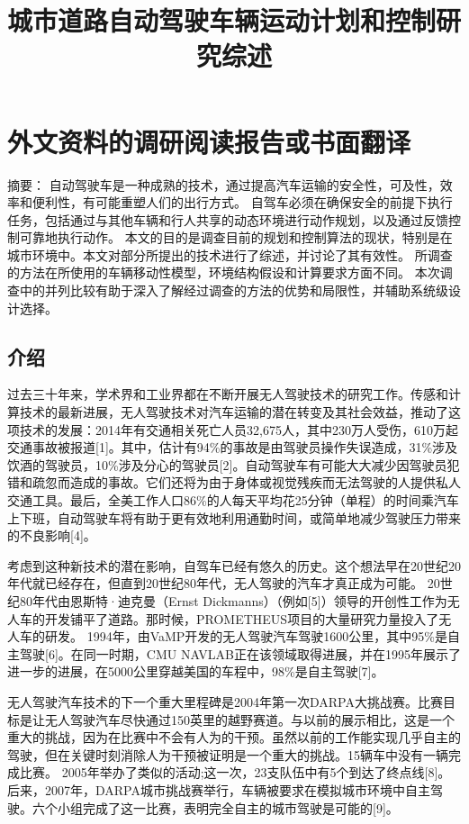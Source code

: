 \chapter{外文资料的调研阅读报告或书面翻译}

\title{城市道路自动驾驶车辆运动计划和控制研究综述}

{\heiti 摘要：} 自动驾驶车是一种成熟的技术，通过提高汽车运输的安全性，可及性，效率和便利性，有可能重塑人们的出行方式。 自驾车必须在确保安全的前提下执行任务，包括通过与其他车辆和行人共享的动态环境进行动作规划，以及通过反馈控制可靠地执行动作。 本文的目的是调查目前的规划和控制算法的现状，特别是在城市环境中。本文对部分所提出的技术进行了综述，并讨论了其有效性。 所调查的方法在所使用的车辆移动性模型，环境结构假设和计算要求方面不同。 本次调查中的并列比较有助于深入了解经过调查的方法的优势和局限性，并辅助系统级设计选择。

\section{介绍}

过去三十年来，学术界和工业界都在不断开展无人驾驶技术的研究工作。传感和计算技术的最新进展，无人驾驶技术对汽车运输的潜在转变及其社会效益，推动了这项技术的发展：2014年有交通相关死亡人员32,675人，其中230万人受伤，610万起交通事故被报道[1]。其中，估计有94\%的事故是由驾驶员操作失误造成，31\%涉及饮酒的驾驶员，10\%涉及分心的驾驶员[2]。自动驾驶车有可能大大减少因驾驶员犯错和疏忽而造成的事故。它们还将为由于身体或视觉残疾而无法驾驶的人提供私人交通工具。最后，全美工作人口86\%的人每天平均花25分钟（单程）的时间乘汽车上下班，自动驾驶车将有助于更有效地利用通勤时间，或简单地减少驾驶压力带来的不良影响[4]。

考虑到这种新技术的潜在影响，自驾车已经有悠久的历史。这个想法早在20世纪20年代就已经存在，但直到20世纪80年代，无人驾驶的汽车才真正成为可能。 20世纪80年代由恩斯特·迪克曼（Ernst Dickmanns）（例如[5]）领导的开创性工作为无人车的开发铺平了道路。那时候，PROMETHEUS项目的大量研究力量投入了无人车的研发。 1994年，由VaMP开发的无人驾驶汽车驾驶1600公里，其中95\%是自主驾驶[6]。在同一时期，CMU NAVLAB正在该领域取得进展，并在1995年展示了进一步的进展，在5000公里穿越美国的车程中，98\%是自主驾驶[7]。

无人驾驶汽车技术的下一个重大里程碑是2004年第一次DARPA大挑战赛。比赛目标是让无人驾驶汽车尽快通过150英里的越野赛道。与以前的展示相比，这是一个重大的挑战，因为在比赛中不会有人为的干预。虽然以前的工作能实现几乎自主的驾驶，但在关键时刻消除人为干预被证明是一个重大的挑战。15辆车中没有一辆完成比赛。 2005年举办了类似的活动;这一次，23支队伍中有5个到达了终点线[8]。后来，2007年，DARPA城市挑战赛举行，车辆被要求在模拟城市环境中自主驾驶。六个小组完成了这一比赛，表明完全自主的城市驾驶是可能的[9]。

